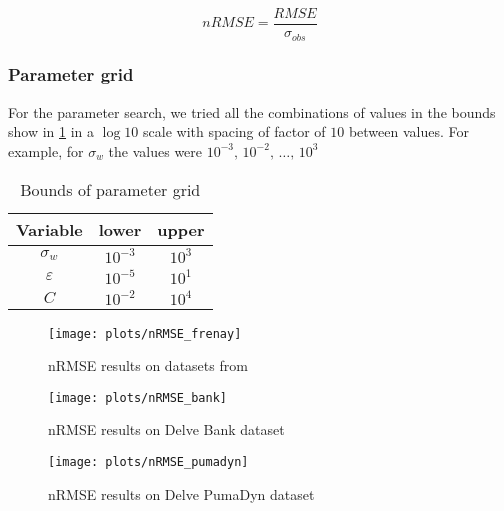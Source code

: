 \begin{equation}
    nRMSE = \frac{RMSE}{\sigma_{obs}}
\end{equation}

\subsubsection{Parameter grid}

For the parameter search, we tried all the combinations of values
in the bounds show in \cref{tab:paramgrid} in a $\log 10$ scale with
spacing of factor of $10$ between values. For example, for $\sigma_w$ the values
were $10^{-3},\,10^{-2},\,\dots,\,10^{3}$

\begin{table}[H]
    \caption{Bounds of parameter grid}%
    \label{tab:paramgrid}
    \begin{tabular}{ccc}
        \toprule
        Variable & lower & upper \\
        \midrule
        $\sigma_w$ & $10^{-3}$ & $10^3$ \\
        $\varepsilon$ & $10^{-5}$ & $10^1$ \\
        $C$ & $10^{-2}$ & $10^4$ \\
        \bottomrule
    \end{tabular}
\end{table}

\begin{figure}
    \texttt{[image: plots/nRMSE\_frenay]}
    \caption{nRMSE results on datasets from \cite{frenayParameterinsensitiveKernelExtreme2011}}
\end{figure}

\begin{figure}
    \texttt{[image: plots/nRMSE\_bank]}
    \caption{nRMSE results on Delve Bank dataset}
\end{figure}

\begin{figure}
    \texttt{[image: plots/nRMSE\_pumadyn]}
    \caption{nRMSE results on Delve PumaDyn dataset}
\end{figure}
